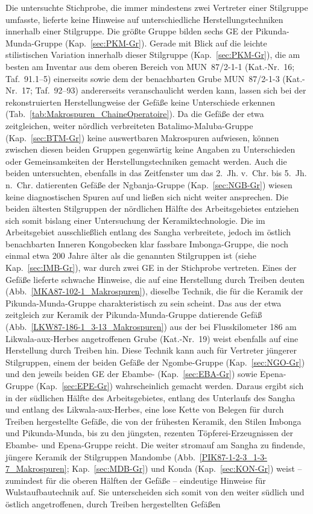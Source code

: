 \begin{multicols}{2}
Die untersuchte Stichprobe, die immer mindestens zwei Vertreter einer Stilgruppe umfasste, lieferte keine Hinweise auf unterschiedliche Herstellungstechniken innerhalb einer Stilgruppe. Die größte Gruppe bilden sechs GE der Pikunda-Munda-Gruppe (Kap.~\ref{sec:PKM-Gr}). Gerade mit Blick auf die leichte stilistischen Variation innerhalb dieser Stilgruppe (Kap.~\ref{sec:PKM-Gr}), die am besten am Inventar aus dem oberen Bereich von MUN~87/2-1-1 (Kat.-Nr.~16; Taf.~91.1--5) einerseits sowie dem der benachbarten Grube MUN~87/2-1-3 (Kat.-Nr.~17; Taf.~92--93) andererseits veranschaulicht werden kann, lassen sich bei der rekonstruierten Herstellungweise der Gefäße keine Unterschiede erkennen (Tab.~\ref{tab:Makrospuren_ChaineOperatoire}). Da die Gefäße der etwa zeitgleichen, weiter nördlich verbreiteten Batalimo-Maluba-Gruppe (Kap.~\ref{sec:BTM-Gr}) keine auswertbaren Makrospuren aufwiesen, können zwischen diesen beiden Gruppen gegenwärtig keine Angaben zu Unterschieden oder Gemeinsamkeiten der Herstellungstechniken gemacht werden. Auch die beiden untersuchten, ebenfalls in das Zeitfenster um das 2.~Jh. v.~Chr. bis 5.~Jh. n.~Chr. datierenten Gefäße der \mbox{Ngbanja}-Gruppe (Kap.~\ref{sec:NGB-Gr}) wiesen keine diagnostischen Spuren auf und ließen sich nicht weiter ansprechen. Die beiden ältesten Stilgruppen der nördlichen Hälfte des Arbeitsgebietes entziehen sich somit bislang einer Untersuchung der Keramiktechnologie. Die im Arbeitsgebiet ausschließlich entlang des \mbox{Sangha} verbreitete, jedoch im östlich benachbarten Inneren Kongobecken \parencite{Wotzka.1995} klar fassbare Imbonga-Gruppe, die noch einmal etwa 200 Jahre älter als die genannten Stilgruppen ist (siehe Kap.~\ref{sec:IMB-Gr}), war durch zwei GE in der Stichprobe vertreten. Eines der Gefäße lieferte schwache Hinweise, die auf eine Herstellung durch Treiben deuten (Abb.~\ref{MKA87-102-1_Makrospuren}), dieselbe Technik, die für die Keramik der Pikunda-Munda-Gruppe charakteristisch zu sein scheint. Das aus der etwa zeitgleich zur Keramik der Pikunda-Munda-Gruppe datierende Gefäß (Abb.~\ref{LKW87-186-1_3-13_Makrospuren}) aus der bei Flusskilometer 186 am \mbox{Likwala}-\mbox{aux}-\mbox{Herbes} angetroffenen Grube (Kat.-Nr.~19) weist ebenfalls auf eine Herstellung durch Treiben hin. Diese Technik kann auch für Vertreter jüngerer Stilgruppen, einem der beiden Gefäße der Ngombe-Gruppe (Kap.~\ref{sec:NGO-Gr}) und den jeweils beiden GE der Ebambe- (Kap.~\ref{sec:EBA-Gr}) sowie Epena-Gruppe (Kap.~\ref{sec:EPE-Gr}) wahrscheinlich gemacht werden. Daraus ergibt sich in der südlichen Hälfte des Arbeitsgebietes, entlang des Unterlaufs des \mbox{Sangha} und entlang des Likwala-aux-Herbes, eine lose Kette von Belegen für durch Treiben hergestellte Gefäße, die von der frühesten Keramik, den Stilen Imbonga und Pikunda-Munda, bis zu den jüngsten, rezenten Töpferei-Erzeugnissen der Ebambe- und Epena-Gruppe reicht. Die weiter stromauf am \mbox{Sangha} zu findende, jüngere Keramik der Stilgruppen Mandombe (Abb.~\ref{PIK87-1-2-3_1-3-7_Makrospuren}; Kap.~\ref{sec:MDB-Gr}) und Konda (Kap.~\ref{sec:KON-Gr}) weist -- zumindest für die oberen Hälften der Gefäße -- eindeutige Hinweise für Wulstaufbautechnik auf. Sie unterscheiden sich somit von den weiter südlich und östlich angetroffenen, durch Treiben hergestellten Gefäßen 
\end{multicols}
